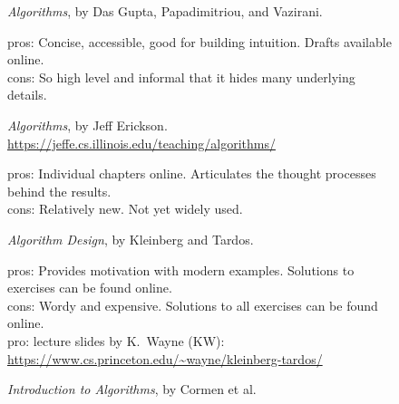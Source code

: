 \documentclass[11pt]{article}
\begin{document}
  \begin{figure}
    \begin{myframed}
\begin{description}\small

\item[(\hypertarget{source.DPV}{DPV})] \emph{Algorithms}, by Das Gupta, Papadimitriou, and Vazirani.  %

    pros: Concise, accessible, good for building intuition.  Drafts available online.
  \\ cons: So high level and informal that it hides many underlying details.
  

\item[(\href{https://jeffe.cs.illinois.edu/teaching/algorithms/}{JE})]
  \emph{Algorithms}, by Jeff Erickson.
  {\small \url{https://jeffe.cs.illinois.edu/teaching/algorithms/}}

  pros: Individual chapters online. Articulates the thought processes behind the results.
  \\ cons: Relatively new.  Not yet widely used.  

\item[(\hypertarget{source.KT}{KT})] \emph{Algorithm Design}, by Kleinberg and Tardos.
    
    pros: Provides motivation with modern examples.  Solutions to exercises can be found online.
    \\cons: Wordy and expensive. Solutions to all exercises can be found online.
    \\pro: lecture slides by K.~Wayne (KW):
  {\footnotesize \url{https://www.cs.princeton.edu/~wayne/kleinberg-tardos/}}
    
  \item[(\hypertarget{source.CLRS}{CLRS})] \emph{Introduction to Algorithms}, by Cormen et al.
    

\end{description}
\end{myframed}
\end{figure}
\end{document}
